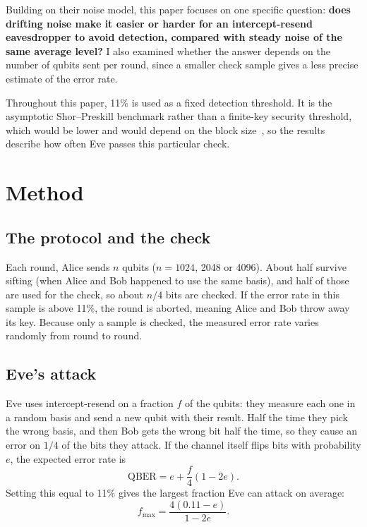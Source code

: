 \documentclass[11pt]{article}
\begin{document}
Building on their noise model, this paper focuses on one specific question: \textbf{does drifting noise make it easier or harder for an intercept-resend eavesdropper to avoid detection, compared with steady noise of the same average level?} I also examined whether the answer depends on the number of qubits sent per round, since a smaller check sample gives a less precise estimate of the error rate.

Throughout this paper, 11\% is used as a fixed detection threshold. It is the asymptotic Shor--Preskill benchmark rather than a finite-key security threshold, which would be lower and would depend on the block size~\cite{Tomamichel}, so the results describe how often Eve passes this particular check.

\section{Method}

\subsection{The protocol and the check}

Each round, Alice sends $n$ qubits ($n = 1024$, 2048 or 4096). About half survive sifting (when Alice and Bob happened to use the same basis), and half of those are used for the check, so about $n/4$ bits are checked. If the error rate in this sample is above 11\%, the round is aborted, meaning Alice and Bob throw away its key. Because only a sample is checked, the measured error rate varies randomly from round to round.

\subsection{Eve's attack}

Eve uses intercept-resend on a fraction $f$ of the qubits: they measure each one in a random basis and send a new qubit with their result. Half the time they pick the wrong basis, and then Bob gets the wrong bit half the time, so they cause an error on $1/4$ of the bits they attack. If the channel itself flips bits with probability $e$, the expected error rate is
\begin{equation}
\text{QBER} = e + \frac{f}{4}(1-2e).
\end{equation}
Setting this equal to 11\% gives the largest fraction Eve can attack on average:
\begin{equation}
f_{\max} = \frac{4(0.11 - e)}{1 - 2e}.
\end{equation}
\end{document}
